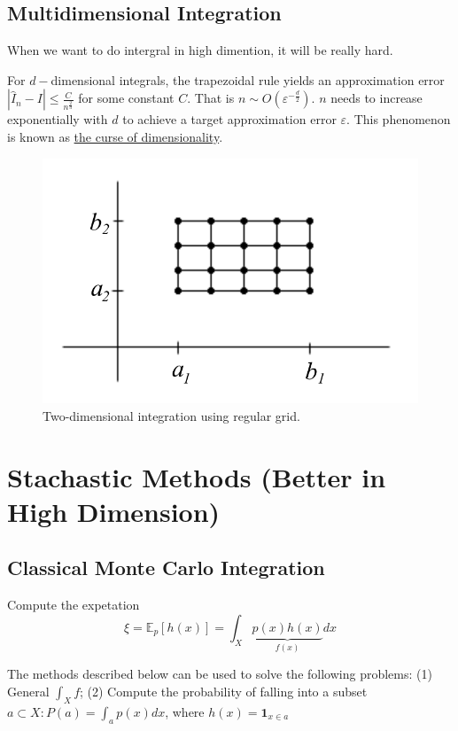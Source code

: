 \documentclass[11pt]{elegantbook}
\begin{document}
\subsection{Multidimensional Integration}
When we want to do intergral in high dimention, it will be really hard.

For $d-$dimensional integrals, the trapezoidal rule yields an approximation error $|\hat{I}_n-I|\leq \frac{C}{n^\frac{2}{d}}$ for some constant $C$. That is $n\sim O\left(\varepsilon^{-\frac{d}{2}}\right)$. $n$ needs to increase exponentially with $d$ to achieve a target approximation error $\varepsilon$. This phenomenon is known as \underline{the curse of dimensionality}.
\begin{center}\begin{figure}[htbp]
    \centering
    \includegraphics[scale=0.3]{two-dim int.png}
    \caption{Two-dimensional integration using regular grid.}
    \label{}
\end{figure}\end{center}



\section{Stachastic Methods (Better in High Dimension)}
\subsection{Classical Monte Carlo Integration}

Compute the expetation $$\xi=\mathbb{E}_p[h(x)]=\int_X \underbrace{p(x)h(x)}_{f(x)}dx$$

The methods described below can be used to solve the following problems: (1) General $\int_X f$; (2) Compute the probability of falling into a subset $a\subset X :P(a)=\int_a p(x)dx$, where $h(x)=\mathbf{1}_{x\in a}$
\end{document}
